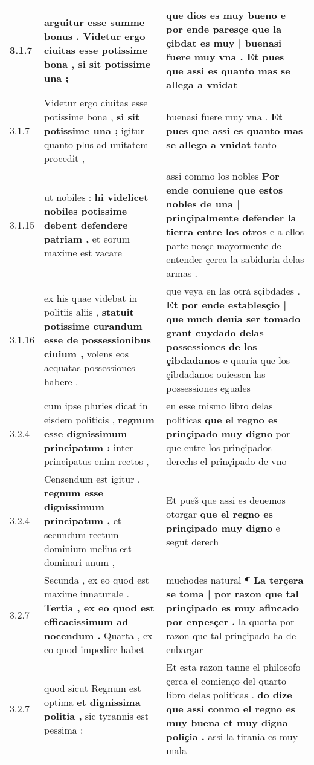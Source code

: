 \begin{tabular}{|p{1cm}|p{6.5cm}|p{6.5cm}|}
3.1.7 & arguitur esse summe bonus . \textbf{ Videtur ergo ciuitas esse potissime bona , } si sit potissime una ; & que dios es muy bueno \textbf{ e por ende paresçe que la çibdat es muy | buenasi fuere muy vna . } Et pues que assi es quanto mas se allega a vnidat \\\hline
3.1.7 & Videtur ergo ciuitas esse potissime bona , \textbf{ si sit potissime una ; } igitur quanto plus ad unitatem procedit , & buenasi fuere muy vna . \textbf{ Et pues que assi es quanto mas se allega a vnidat } tanto \\\hline
3.1.15 & ut nobiles : \textbf{ hi videlicet nobiles potissime debent defendere patriam , } et eorum maxime est vacare & assi commo los nobles \textbf{ Por ende conuiene que estos nobles de una | prinçipalmente defender la tierra entre los otros } e a ellos parte nesçe mayormente de entender çerca la sabiduria delas armas . \\\hline
3.1.16 & ex his quae videbat in politiis aliis , \textbf{ statuit potissime curandum esse de possessionibus ciuium , } volens eos aequatas possessiones habere . & que veya en las otrå sçibdades . \textbf{ Et por ende establesçio | que much deuia ser tomado grant cuydado delas possessiones de los çibdadanos } e quaria que los çibdadanos ouiessen las possessiones eguales \\\hline
3.2.4 & cum ipse pluries dicat in eisdem politicis , \textbf{ regnum esse dignissimum principatum : } inter principatus enim rectos , & en esse mismo libro delas politicas \textbf{ que el regno es prinçipado muy digno } por que entre los prinçipados derechs el prinçipado de vno \\\hline
3.2.4 & Censendum est igitur , \textbf{ regnum esse dignissimum principatum , } et secundum rectum dominium melius est dominari unum , & Et pues̃ que assi es deuemos otorgar \textbf{ que el regno es prinçipado muy digno } e segut derech \\\hline
3.2.7 & Secunda , ex eo quod est maxime innaturale . \textbf{ Tertia , ex eo quod est efficacissimum ad nocendum . } Quarta , ex eo quod impedire habet & muchodes natural ¶ \textbf{ La terçera se toma | por razon que tal prinçipado es muy afincado por enpesçer . } la quarta por razon que tal prinçipado ha de enbargar \\\hline
3.2.7 & quod sicut Regnum est optima \textbf{ et dignissima politia , } sic tyrannis est pessima : & Et esta razon tanne el philosofo çerca el comienço del quarto libro delas politicas . \textbf{ do dize que assi conmo el regno es muy buena et muy digna poliçia . } assi la tirania es muy mala \\\hline

\end{tabular}

